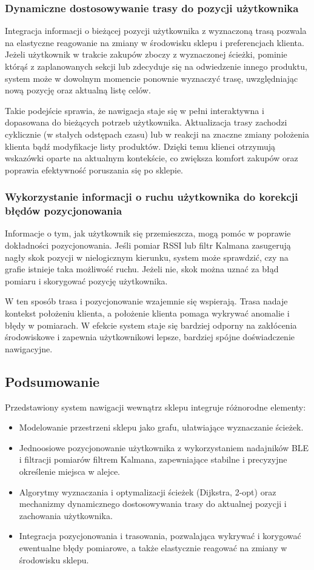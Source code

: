 \subsubsection{Dynamiczne dostosowywanie trasy do pozycji użytkownika}
Integracja informacji o bieżącej pozycji użytkownika z wyznaczoną trasą pozwala na elastyczne reagowanie na zmiany w środowisku sklepu i preferencjach klienta. Jeżeli użytkownik w trakcie zakupów zboczy z wyznaczonej ścieżki, pominie którąś z zaplanowanych sekcji lub zdecyduje się na odwiedzenie innego produktu, system może w dowolnym momencie ponownie wyznaczyć trasę, uwzględniając nową pozycję oraz aktualną listę celów.

Takie podejście sprawia, że nawigacja staje się w pełni interaktywna i dopasowana do bieżących potrzeb użytkownika. Aktualizacja trasy zachodzi cyklicznie (w stałych odstępach czasu) lub w reakcji na znaczne zmiany położenia klienta bądź modyfikacje listy produktów. Dzięki temu klienci otrzymują wskazówki oparte na aktualnym kontekście, co zwiększa komfort zakupów oraz poprawia efektywność poruszania się po sklepie.

\subsubsection{Wykorzystanie informacji o ruchu użytkownika do korekcji błędów pozycjonowania}
Informacje o tym, jak użytkownik się przemieszcza, mogą pomóc w poprawie dokładności pozycjonowania. Jeśli pomiar RSSI lub filtr Kalmana zasugerują nagły skok pozycji w nielogicznym kierunku, system może sprawdzić, czy na grafie istnieje taka możliwość ruchu. Jeżeli nie, skok można uznać za błąd pomiaru i skorygować pozycję użytkownika.

W ten sposób trasa i pozycjonowanie wzajemnie się wspierają. Trasa nadaje kontekst położeniu klienta, a położenie klienta pomaga wykrywać anomalie i błędy w pomiarach. W efekcie system staje się bardziej odporny na zakłócenia środowiskowe i zapewnia użytkownikowi lepsze, bardziej spójne doświadczenie nawigacyjne.

\subsection{Podsumowanie}
Przedstawiony system nawigacji wewnątrz sklepu integruje różnorodne elementy:
\begin{itemize}
    \item Modelowanie przestrzeni sklepu jako grafu, ułatwiające wyznaczanie ścieżek.
    \item Jednoosiowe pozycjonowanie użytkownika z wykorzystaniem nadajników BLE i filtracji pomiarów filtrem Kalmana, zapewniające stabilne i precyzyjne określenie miejsca w alejce.
    \item Algorytmy wyznaczania i optymalizacji ścieżek (Dijkstra, 2-opt) oraz mechanizmy dynamicznego dostosowywania trasy do aktualnej pozycji i zachowania użytkownika.
    \item Integracja pozycjonowania i trasowania, pozwalająca wykrywać i korygować ewentualne błędy pomiarowe, a także elastycznie reagować na zmiany w środowisku sklepu.
\end{itemize}
